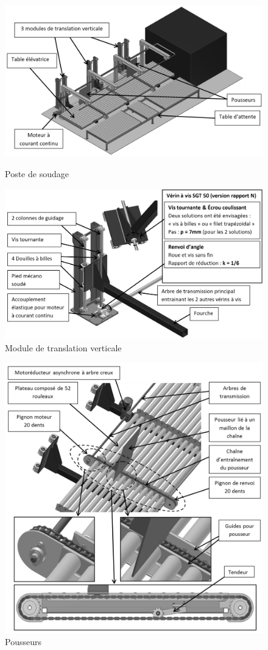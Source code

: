 \begin{figure}[!h]
\centering
\begin{minipage}{0.45\linewidth}
\includegraphics[width=\linewidth]{img/fig3}
\caption{Poste de soudage}
\label{fig3}
\end{minipage}\hfill
\begin{minipage}{0.45\linewidth}
\includegraphics[width=\linewidth]{img/fig4}
\caption{Module de translation verticale}
\label{fig4}
\end{minipage}
\end{figure}

\begin{figure}[!h]
\centering
\includegraphics[width=0.6\linewidth]{img/fig5}
\caption{Pousseurs}
\label{fig5}
\end{figure}


